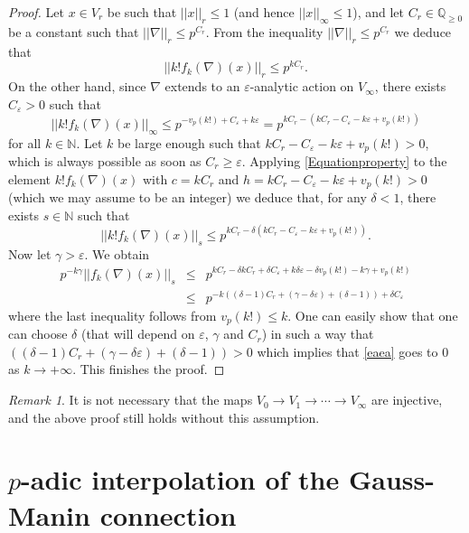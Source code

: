 \documentclass[10pt, oneside]{amsart}
\numberwithin{equation}{subsection}
\theoremstyle{definition}
\theoremstyle{remark}
\newtheorem{remark}[equation]{Remark}
\newcommand{\mbb}[1]{\mathbb{#1}}
\def\N{{\mathbb{N}}}
\def\epsilon{\varepsilon}
\begin{document}
\begin{proof}
Let $x \in V_r$ be such that $|\!|x|\!|_r \leq 1$ (and hence $|\!|x|\!|_\infty \leq 1$), and let $C_r \in \mbb{Q}_{\geq 0}$ be a constant such that $|\!|\nabla|\!|_r \leq p^{C_r}$. From the inequality $|\!|\nabla|\!|_r \leq p^{C_r}$ we deduce that
\[ |\!|k! f_k(\nabla)(x)|\!|_r \leq  p^{k C_r}. \]
On the other hand, since $\nabla$ extends to an $\epsilon$-analytic action on $V_\infty$, there exists $C_\epsilon > 0$ such that
\[ |\!| k! f_k(\nabla)(x)|\!|_\infty \leq p^{-v_p(k!) + C_\epsilon + k \epsilon} = p^{kC_r - (k C_r - C_\epsilon - k \epsilon + v_p(k!))} \]
for all $k \in \N$. Let $k$ be large enough such that $k C_r - C_\epsilon - k \epsilon + v_p(k!) > 0$, which is always possible as soon as $C_r \geq \epsilon$. Applying \eqref{Equationproperty} to the element $k! f_k(\nabla)(x)$ with $c = kC_r$ and $h = k C_r - C_\epsilon - k \epsilon + v_p(k!) > 0$ (which we may assume to be an integer) we deduce that, for any $\delta < 1$, there exists $s \in \N$ such that
\[ |\!| k! f_k(\nabla)(x)|\!|_s \leq p^{k C_r - \delta(k C_r - C_\epsilon - k \epsilon + v_p(k!))}. \]
Now let $\gamma > \epsilon$. We obtain
\begin{eqnarray} \label{eaea}
p^{-k \gamma} |\!|f_k(\nabla)(x)|\!|_s &\leq& p^{k C_r - \delta k C_r + \delta C_\epsilon + k \delta \epsilon - \delta v_p(k!) - k \gamma + v_p(k!)} \\
& \leq & p^{-k \left( (\delta - 1) C_r + (\gamma - \delta \epsilon) + (\delta - 1) \right) + \delta C_{\varepsilon}} \nonumber
\end{eqnarray}
where the last inequality follows from $v_p(k!) \leq k$. One can easily show that one can choose $\delta$ (that will depend on $\varepsilon$, $\gamma$ and $C_r$) in such a way that $ \left( (\delta - 1) C_r + (\gamma - \delta \epsilon) + (\delta - 1) \right) > 0$ which implies that \eqref{eaea} goes to $0$ as $k \to + \infty$. This finishes the proof.
\end{proof}

\begin{remark} \label{OverconvergenceOfActionRemark}
It is not necessary that the maps $V_0 \to V_1 \to \cdots \to V_{\infty}$ are injective, and the above proof still holds without this assumption.
\end{remark}

\section{\texorpdfstring{$p$}{p}-adic interpolation of the Gauss-Manin connection} \label{GMinterpolationSection}
\end{document}

